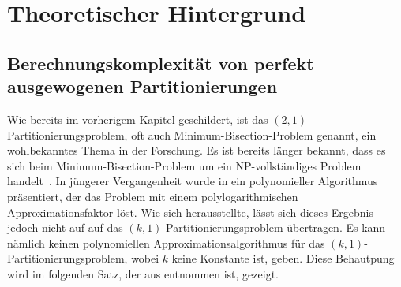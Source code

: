 
\chapter{Theoretischer Hintergrund}\label{chapter:theorie}
\section{Berechnungskomplexität von perfekt ausgewogenen Partitionierungen }
Wie bereits im vorherigem Kapitel geschildert, ist das $(2,1)$-Partitionierungsproblem, oft auch Minimum-Bisection-Problem genannt, ein wohlbekanntes Thema in der Forschung. 
Es ist bereits länger bekannt, dass es sich beim Minimum-Bisection-Problem um ein NP-vollständiges Problem handelt~\parencite{gj79}.
In jüngerer Vergangenheit wurde in \parencite{fk02} ein polynomieller Algorithmus präsentiert, der das Problem mit einem polylogarithmischen Approximationsfaktor löst. 
Wie sich herausstellte, lässt sich dieses Ergebnis jedoch nicht auf auf das $(k,1)$-Partitionierungsproblem übertragen.
Es kann nämlich keinen polynomiellen Approximationsalgorithmus für das $(k,1)$-Partitionierungsproblem, wobei $k$ keine Konstante ist, geben.
Diese Behautpung wird im folgenden Satz, der aus \parencite{ar06} entnommen ist, gezeigt. \\

